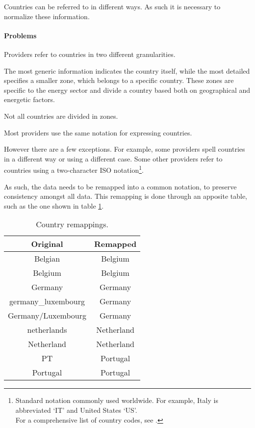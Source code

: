 Countries can be referred to in different ways.
As such it is necessary to normalize these information.

\paragraph{Problems}
    Providers refer to countries in two different granularities.
    
    The most generic information indicates the country itself, while the most detailed specifies a smaller zone, which belongs to a specific country.
    These zones are specific to the energy sector and divide a country based both on geographical and energetic factors.
    
    Not all countries are divided in zones.

        Most providers use the same notation for expressing countries.
        
        However there are a few exceptions.
        For example, some providers spell countries in a different way or using a different case.
        Some other providers refer to countries using a two-character ISO notation\footnote{
            Standard notation commonly used worldwide.
            For example, Italy is abbreviated `IT' and United States `US'.\\
            For a comprehensive list of country codes, see \cite{bib:country_codes}.
        }.
        
        As such, the data needs to be remapped into a common notation, to preserve consistency amongst all data.
        This remapping is done through an apposite table, such as the one shown in table \ref{tab:dwh:remapping:country}.
        
        \begin{table}
            \centering
            \begin{tabular}{|c|c|}
                \toprule
                Original            & Remapped      \\
                \midrule
                Belgian	            & Belgium       \\
                Belgium	            & Belgium       \\
                \midrule
                Germany             & Germany       \\
                germany\_luxembourg	& Germany       \\
                Germany/Luxembourg	& Germany       \\
                \midrule
                netherlands	        & Netherland    \\
                Netherland	        & Netherland    \\
                \midrule
                PT	                & Portugal      \\
                Portugal	        & Portugal      \\
                \bottomrule
            \end{tabular}
            \caption{Country remappings.}
            \label{tab:dwh:remapping:country}
        \end{table}
        
